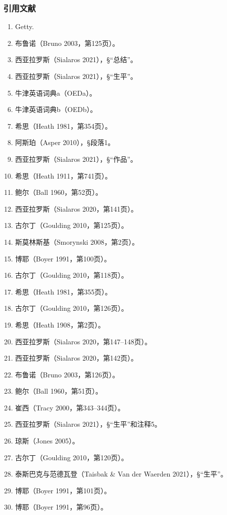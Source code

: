\subsubsection{引用文献}  
\begin{enumerate}
\item Getty.  
\item 布鲁诺（Bruno 2003，第125页）。  
\item 西亚拉罗斯（Sialaros 2021），§“总结”。  
\item 西亚拉罗斯（Sialaros 2021），§“生平”。  
\item 牛津英语词典a（OEDa）。  
\item 牛津英语词典b（OEDb）。  
\item 希思（Heath 1981，第354页）。  
\item 阿斯珀（Asper 2010），§段落1。  
\item 西亚拉罗斯（Sialaros 2021），§“作品”。  
\item 希思（Heath 1911，第741页）。  
\item 鲍尔（Ball 1960，第52页）。  
\item 西亚拉罗斯（Sialaros 2020，第141页）。  
\item 古尔丁（Goulding 2010，第125页）。  
\item 斯莫林斯基（Smorynski 2008，第2页）。  
\item 博耶（Boyer 1991，第100页）。  
\item 古尔丁（Goulding 2010，第118页）。  
\item 希思（Heath 1981，第355页）。  
\item 古尔丁（Goulding 2010，第126页）。  
\item 希思（Heath 1908，第2页）。  
\item 西亚拉罗斯（Sialaros 2020，第147–148页）。  
\item 西亚拉罗斯（Sialaros 2020，第142页）。  
\item 布鲁诺（Bruno 2003，第126页）。  
\item 鲍尔（Ball 1960，第51页）。  
\item 崔西（Tracy 2000，第343–344页）。  
\item 西亚拉罗斯（Sialaros 2021），§“生平”和注释5。  
\item 琼斯（Jones 2005）。
\item 古尔丁（Goulding 2010，第120页）。
\item 泰斯巴克与范德瓦登（Taisbak & Van der Waerden 2021），§“生平”。
\item 博耶（Boyer 1991，第101页）。
\item 博耶（Boyer 1991，第96页）。

\end{enumerate}
